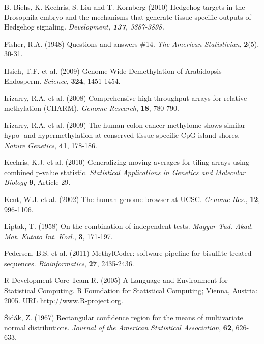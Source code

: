 \documentclass{bioinfo}
\begin{document}
\begin{thebibliography}{}

B. Biehs, K. Kechris, S. Liu and T. Kornberg (2010)
Hedgehog targets in the Drosophila embryo and the mechanisms that generate tissue-specific outputs of Hedgehog signaling. \it{Development}, {\bf 137}, 3887-3898.

Fisher, R.A. (1948)
Questions and answers \#14.
{\it The American Statistician}, {\bf 2}(5), 30-31.

 Hsieh, T.F. et al. (2009)
Genome-Wide Demethylation of Arabidopsis Endosperm.
{\it Science}, {\bf 324}, 1451-1454.

 Irizarry, R.A. et al.
(2008) Comprehensive high-throughput arrays for relative methylation (CHARM).
{\it Genome Research}, {\bf 18}, 780-790.

 Irizarry, R.A. et al.
(2009) The human colon cancer methylome shows similar hypo- and
hypermethylation at conserved tissue-specific CpG island shores.
{\it Nature Genetics}, {\bf 41}, 178-186.

Kechris, K.J. et al. (2010)
Generalizing moving averages for tiling arrays using combined p-value
statistic. {\it Statistical Applications in Genetics and Molecular Biology}
{\bf 9}, Article 29.

 Kent, W.J. et al. (2002) The human genome browser at UCSC. {\it
Genome Res.}, {\bf 12}, 996-1106.

Liptak, T. (1958) On the combination of independent tests. {\it Magyar Tud.
Akad. Mat. Kutato Int. Kozl.}, {\bf 3}, 171-197.

 Pedersen, B.S. et al.
(2011) MethylCoder: software pipeline for bisulfite-treated sequences.
{\it Bioinformatics}, {\bf 27}, 2435-2436.

R Development Core Team R. (2005)
A Language and Environment for Statistical Computing.
R Foundation for Statistical Computing; Vienna, Austria: 2005. URL http://www.R-project.org.

\v{S}id\'{a}k, Z. (1967)
Rectangular confidence region for the means
 of multivariate normal distributions.
\textit{Journal of the American Statistical Association}, {\bf 62}, 626-633.


\end{thebibliography}
\end{document}
